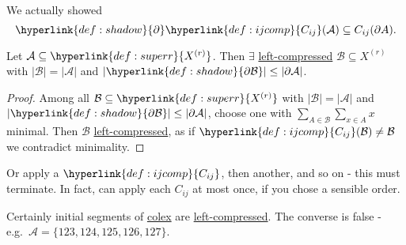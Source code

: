\documentclass{article}
\let\subset\subseteq
\begin{document}
\begin{remark}
  We actually showed
  \begin{equation*}
    \hyperlink{def:shadow}{\partial} \hyperlink{def:ijcomp}{C_{ij}}(\mathcal{A}) \subset C_{ij}(\partial A). %
  \end{equation*}
\end{remark}
\begin{nprop}\label{prop:1.5}
  Let $\mathcal{A} \subset \hyperlink{def:superr}{X^{(r)}}$.
  Then $\exists$ \hyperlink{def:leftcomp}{left-compressed} $\mathcal{B} \subset X^{(r)}$ with $|\mathcal{B}| = |\mathcal{A}|$ and $|\hyperlink{def:shadow}{\partial \mathcal{B}}| \leq |\partial \mathcal{A}|$.
\end{nprop}
\begin{proof}
  Among all $\mathcal{B} \subset \hyperlink{def:superr}{X^{(r)}}$ with $|\mathcal{B}| = |\mathcal{A}|$ and $|\hyperlink{def:shadow}{\partial \mathcal{B}}| \leq |\partial \mathcal{A}|$,
  choose one with $\sum_{A \in \mathcal{B}} \sum_{x \in A} x$ minimal.
  Then $\mathcal{B}$ \hyperlink{def:leftcomp}{left-compressed}, as if $\hyperlink{def:ijcomp}{C_{ij}}(\mathcal{B}) \neq \mathcal{B}$ we contradict minimality.
\end{proof}
\begin{remark}
  Or apply a $\hyperlink{def:ijcomp}{C_{ij}}$, then another, and so on - this must terminate.
  In fact, can apply each $C_{ij}$ at most once, if you chose a sensible order.
\end{remark}

Certainly initial segments of \hyperlink{def:colex}{colex} are \hyperlink{def:leftcomp}{left-compressed}.
The converse is false - e.g.\ $\mathcal{A} = \{123,124,125,126,127\}$.
\end{document}
